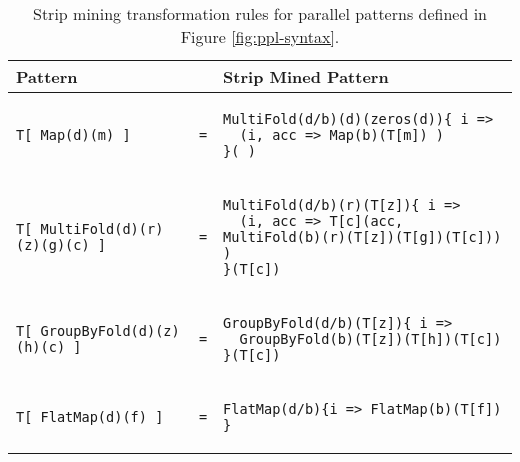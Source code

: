 \begin{table*}[t]
\small\centering
\begin{tabular}{@{}lll@{}}
\toprule
{\bf Pattern }    & { }  & {\bf Strip Mined Pattern} \\ \midrule
{\begin{lstlisting}[mathescape=true,numbers=none,basicstyle=\fontsize{8}{8}\selectfont\tt]
T[ Map(d)(m) ]
\end{lstlisting}
} & \texttt{=} &
{\begin{lstlisting}[mathescape=true,numbers=none,basicstyle=\fontsize{8}{8}\selectfont\tt]
MultiFold(d/b)(d)(zeros(d)){ i =>
  (i, acc => Map(b)(T[m]) )
}(_)
\end{lstlisting}
} \\ \midrule
{\begin{lstlisting}[mathescape=true,numbers=none,basicstyle=\fontsize{8}{8}\selectfont\tt]
T[ MultiFold(d)(r)(z)(g)(c) ]
\end{lstlisting}
} & \texttt{=} &
{\begin{lstlisting}[mathescape=true,numbers=none,basicstyle=\fontsize{8}{8}\selectfont\tt]
MultiFold(d/b)(r)(T[z]){ i =>
  (i, acc => T[c](acc, MultiFold(b)(r)(T[z])(T[g])(T[c])) )
}(T[c])
\end{lstlisting}
} \\ \midrule
{\begin{lstlisting}[mathescape=true,numbers=none,basicstyle=\fontsize{8}{8}\selectfont\tt]
T[ GroupByFold(d)(z)(h)(c) ]
\end{lstlisting}
} & \texttt{=} &
{\begin{lstlisting}[mathescape=true,numbers=none,basicstyle=\fontsize{8}{8}\selectfont\tt]
GroupByFold(d/b)(T[z]){ i =>
  GroupByFold(b)(T[z])(T[h])(T[c])
}(T[c])
\end{lstlisting}
} \\ \midrule
{\begin{lstlisting}[mathescape=true,numbers=none,basicstyle=\fontsize{8}{8}\selectfont\tt]
T[ FlatMap(d)(f) ]
\end{lstlisting}
} & \texttt{=} &
{\begin{lstlisting}[mathescape=true,numbers=none,basicstyle=\fontsize{8}{8}\selectfont\tt]
FlatMap(d/b){i => FlatMap(b)(T[f]) }
\end{lstlisting}
} \\ \bottomrule
\end{tabular}
\caption{Strip mining transformation rules for parallel patterns defined in Figure \ref{fig:ppl-syntax}.}
\label{table:stripmining}
\end{table*}